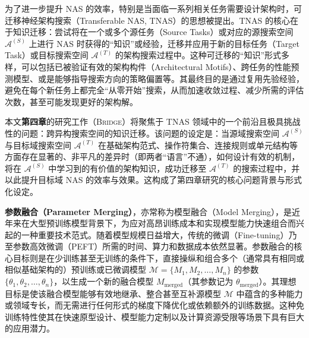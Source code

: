 \documentclass[../main.tex]{subfiles}
\begin{document}
为了进一步提升 NAS 的效率，特别是当面临一系列相关任务需要设计架构时，可迁移神经架构搜索（Transferable NAS, TNAS）的思想被提出。TNAS 的核心在于知识迁移：尝试将在一个或多个源任务（Source Tasks）或对应的源搜索空间 $\mathcal{A}^{(S)}$ 上进行 NAS 时获得的“知识”或经验，迁移并应用于新的目标任务（Target Task）或目标搜索空间 $\mathcal{A}^{(T)}$ 的架构搜索过程中。这种可迁移的“知识”形式多样，可以包括已被验证有效的架构构件（Architectural Motifs）、跨任务的性能预测模型、或是能够指导搜索方向的策略偏置等。其最终目的是通过复用先验经验，避免在每个新任务上都完全“从零开始”搜索，从而加速收敛过程、减少所需的评估次数，甚至可能发现更好的架构解。

本文\textbf{第四章}的研究工作（\textsc{Bridge}）将聚焦于 TNAS 领域中的一个前沿且极具挑战性的问题：跨异构搜索空间的知识迁移。该问题的设定是：当源域搜索空间 $\mathcal{A}^{(S)}$ 与目标域搜索空间 $\mathcal{A}^{(T)}$ 在基础架构范式、操作符集合、连接规则或单元结构等方面存在显著的、非平凡的差异时（即两者“语言”不通），如何设计有效的机制，将在 $\mathcal{A}^{(S)}$ 中学习到的有价值的架构知识，成功迁移至 $\mathcal{A}^{(T)}$ 的搜索过程中，并以此提升目标域 NAS 的效率与效果。这构成了第四章研究的核心问题背景与形式化设定。


\textbf{参数融合（Parameter Merging）}，亦常称为模型融合（Model Merging），是近年来在大型预训练模型背景下，为应对高昂训练成本和实现模型能力快速组合而兴起的一种重要技术范式。随着模型规模日益增大，传统的微调（Fine-tuning）乃至参数高效微调（PEFT）所需的时间、算力和数据成本依然显著。参数融合的核心目标则是在少训练甚至无训练的条件下，直接操纵和组合多个（通常具有相同或相似基础架构的）预训练或已微调模型 $\mathcal{M} = \{M_1, M_2, \dots, M_n\}$ 的参数 $\{\theta_1, \theta_2, \dots, \theta_n\}$，以生成一个新的融合模型 $M_\mathrm{merged}$（其参数记为 $\theta_\mathrm{merged}$）。其理想目标是使该融合模型能够有效地继承、整合甚至互补源模型 $\mathcal{M}$ 中蕴含的多种能力或领域专长，而无需进行任何形式的梯度下降优化或依赖额外的训练数据。这种免训练特性使其在快速原型设计、模型能力定制以及计算资源受限等场景下具有巨大的应用潜力。
\end{document}
